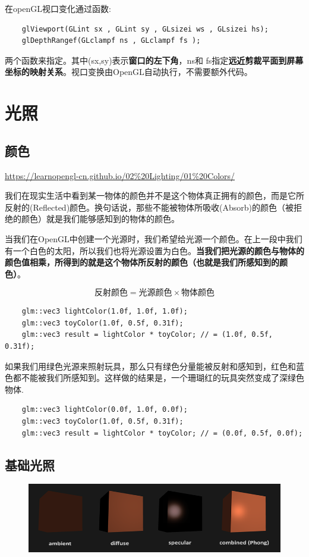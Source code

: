 \documentclass[UTF8,a4paper,12pt]{ctexbook}
\begin{document}
			在openGL视口变化通过函数: 
			\begin{lstlisting}
	glViewport(GLint sx , GLint sy , GLsizei ws , GLsizei hs); 
	glDepthRangef(GLclampf ns , GLclampf fs );
			\end{lstlisting}
			
			两个函数来指定。其中(sx,sy)表示\textbf{窗口的左下角}，ns和 fs指定\textbf{远近剪裁平面到屏幕坐标的映射关系}。视口变换由OpenGL自动执行，不需要额外代码。
			
			
			
			
\chapter{光照}
	\section{颜色}
		\url{https://learnopengl-cn.github.io/02%20Lighting/01%20Colors/}
	
		我们在现实生活中看到某一物体的颜色并不是这个物体真正拥有的颜色，而是它所反射的(Reflected)颜色。换句话说，那些不能被物体所吸收(Absorb)的颜色（被拒绝的颜色）就是我们能够感知到的物体的颜色。
		
		当我们在OpenGL中创建一个光源时，我们希望给光源一个颜色。在上一段中我们有一个白色的太阳，所以我们也将光源设置为白色。\textbf{当我们把光源的颜色与物体的颜色值相乘，所得到的就是这个物体所反射的颜色（也就是我们所感知到的颜色）}。
		
		$$\textbf{反射颜色} = \textbf{光源颜色} \times \textbf{物体颜色}$$
		
		\begin{lstlisting}
	glm::vec3 lightColor(1.0f, 1.0f, 1.0f);
	glm::vec3 toyColor(1.0f, 0.5f, 0.31f);
	glm::vec3 result = lightColor * toyColor; // = (1.0f, 0.5f, 0.31f);		
		\end{lstlisting}
		
		如果我们用绿色光源来照射玩具，那么只有绿色分量能被反射和感知到，红色和蓝色都不能被我们所感知到。这样做的结果是，一个珊瑚红的玩具突然变成了深绿色物体.
		
		\begin{lstlisting}
	glm::vec3 lightColor(0.0f, 1.0f, 0.0f);
	glm::vec3 toyColor(1.0f, 0.5f, 0.31f);
	glm::vec3 result = lightColor * toyColor; // = (0.0f, 0.5f, 0.0f);		
		\end{lstlisting}
		
	\section{基础光照}
			\begin{figure}[H]
				\centering
				\includegraphics[width=.9\linewidth]{basic_lighting_phong}
			\end{figure}
	
\end{document}
